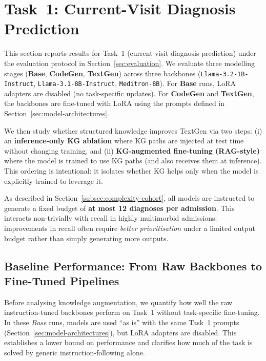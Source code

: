\section{Task~1: Current-Visit Diagnosis Prediction}
\label{sec:results-task1}

This section reports results for Task~1 (current-visit diagnosis prediction) under the evaluation protocol in Section~\ref{sec:evaluation}. We evaluate three modelling stages (\textbf{Base}, \textbf{CodeGen}, \textbf{TextGen}) across three backbones (\texttt{Llama-3.2-1B-Instruct}, \texttt{Llama-3.1-8B-Instruct}, \texttt{Meditron-8B}). 
For \textbf{Base} runs, LoRA adapters are disabled (no task-specific updates). For \textbf{CodeGen} and \textbf{TextGen}, the backbones are fine-tuned with LoRA using the prompts defined in Section~\ref{sec:model-architectures}. 

We then study whether structured knowledge improves TextGen via two steps:
(i) an \textbf{inference-only KG ablation} where KG paths are injected at test time without changing training, and
(ii) \textbf{KG-augmented fine-tuning (RAG-style)} where the model is trained to use KG paths (and also receives them at inference).
This ordering is intentional: it isolates whether KG helps only when the model is explicitly trained to leverage it.

As described in Section~\ref{subsec:complexity-cohort}, all models are instructed to generate a fixed budget of \textbf{at most 12 diagnoses per admission}. This interacts non-trivially with recall in highly multimorbid admissions: improvements in recall often require \emph{better prioritisation} under a limited output budget rather than simply generating more outputs.

\subsection{Baseline Performance: From Raw Backbones to Fine-Tuned Pipelines}
\label{subsec:results-task1-baselines}

Before analysing knowledge augmentation, we quantify how well the raw instruction-tuned backbones perform on Task~1 without task-specific fine-tuning. In these \emph{Base} runs, models are used ``as is'' with the same Task~1 prompts (Section~\ref{sec:model-architectures}), but LoRA adapters are disabled. This establishes a lower bound on performance and clarifies how much of the task is solved by generic instruction-following alone.

